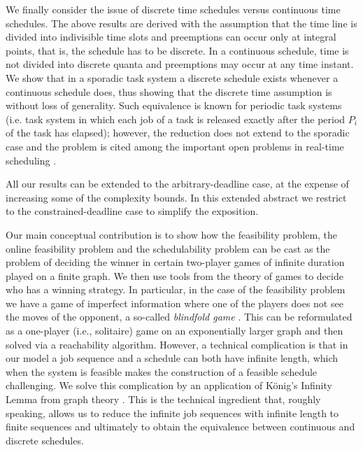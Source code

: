 \documentclass{llncs}
\begin{document}
We finally consider the issue of discrete time schedules versus continuous time schedules. The above results are derived with the assumption that the time line is divided into indivisible time slots and preemptions can occur only at integral points, that is, the schedule has to be discrete. In a continuous schedule, time is not divided into discrete quanta and preemptions may occur at any time instant. We show that in a sporadic task system a discrete schedule exists whenever a continuous schedule does, thus showing that the discrete time assumption is without loss of generality. Such  equivalence is known for periodic task systems (i.e. task system in which each job of a task is released exactly after the period $P_i$ of the task has elapsed); however, the reduction does not extend to the sporadic case and the problem is cited among the important open problems in real-time scheduling  \cite[Open Problem 5]{Baruah:2009:open}. 

\begin{comment}
\begin{table}[t]
\begin{center}
\caption{Summary of the results}
\label{tab:bounds}
\begin{tabular}{lc}
\textbf{Problem} & \textbf{Complexity bound} \\
\hline
Feasibility & EXPSPACE \\
Online feasibility & EXPTIME \\
Schedulability & PSPACE
\end{tabular}
\end{center}
\end{table}
\end{comment}

All our results can be extended to the arbitrary-deadline case, at the expense of increasing some of the complexity bounds. In this extended abstract we restrict to the constrained-deadline case to simplify the exposition. 


Our main conceptual contribution is to show how the feasibility problem, the online feasibility problem and the schedulability problem can be cast as the problem of deciding the winner in certain two-player games of infinite duration played on a finite graph. We then use tools from the theory of games to decide who has a winning strategy. In particular, in the case of the feasibility problem we have a game of imperfect information where one of the players does not see the moves of the opponent, a so-called \emph{blindfold game} \cite{Reif:1984}. This can be reformulated as a one-player (i.e., solitaire) game on an exponentially larger graph and then solved via a reachability algorithm. However, a technical complication is that in our model a job sequence and a schedule can both have infinite length, which when the system is feasible makes the construction of a feasible schedule challenging. We solve this complication by an application of K\"onig's Infinity Lemma from graph theory \cite{Diestel:2005}. This is the technical ingredient that, roughly speaking, allows us to reduce the infinite job  sequences with infinite  length  to finite sequences and ultimately to obtain the equivalence between continuous and discrete schedules. 
\end{document}

